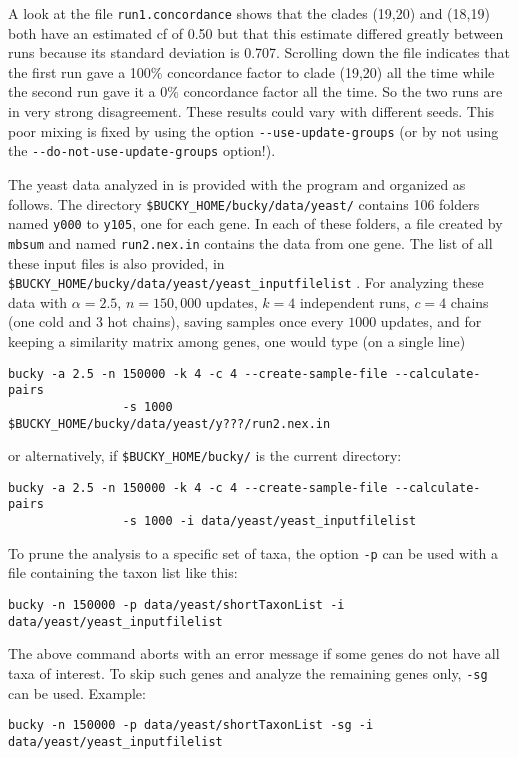 \documentclass[12pt,english,final,letterpaper]{article}
\begin{document}
A look at the file {\tt run1.concordance} shows that the clades (19,20) and
(18,19) both have an estimated {\sc cf} of 0.50 but that this estimate differed
greatly between runs because its standard deviation is 0.707. Scrolling down
the file indicates that the first run gave a 100\% concordance factor to clade
(19,20) all the time while the second run gave it a 0\% concordance factor 
all the time. 
So the two runs are in very strong disagreement. 
These results could vary with different seeds.
This poor mixing is fixed by using the option
\verb+--use-update-groups+ (or by not using the 
\verb+--do-not-use-update-groups+ option!).
\medskip

The yeast data analyzed in \cite{ane-etal-2007} is provided with the program
and organized as follows. The directory
\verb+$BUCKY_HOME/bucky/data/yeast/+ %
contains 106 folders named {\tt y000} to {\tt y105}, one for each gene. 
In each of these folders, a file created by {\tt mbsum} and named 
{\tt run2.nex.in} contains the data from one gene.
The list of all these input files is also provided, in 
\verb+$BUCKY_HOME/bucky/data/yeast/yeast_inputfilelist+ .
For analyzing these data with $\alpha=2.5$, 
$n=150,000$ updates, $k=4$ independent runs, $c=4$ chains 
(one cold and 3 hot chains),
saving samples once every $1000$ updates, and for keeping a similarity 
matrix among genes, one would type (on a single line)
\begin{verbatim}
bucky -a 2.5 -n 150000 -k 4 -c 4 --create-sample-file --calculate-pairs
                -s 1000   $BUCKY_HOME/bucky/data/yeast/y???/run2.nex.in
\end{verbatim}%
or alternatively, if \verb+$BUCKY_HOME/bucky/+ is the current directory:%
\begin{verbatim}
bucky -a 2.5 -n 150000 -k 4 -c 4 --create-sample-file --calculate-pairs
                -s 1000 -i data/yeast/yeast_inputfilelist
\end{verbatim}

To prune the analysis to a specific set of taxa, the option {\tt -p} 
can be used with a file containing the taxon list like this:
\begin{verbatim}
bucky -n 150000 -p data/yeast/shortTaxonList -i data/yeast/yeast_inputfilelist
\end{verbatim}
The above command aborts with an error message if some genes do not have all 
taxa of interest. To skip such genes and analyze the remaining genes only, 
{\tt -sg} can be used. Example:
\begin{verbatim}
bucky -n 150000 -p data/yeast/shortTaxonList -sg -i data/yeast/yeast_inputfilelist
\end{verbatim}
\end{document}
